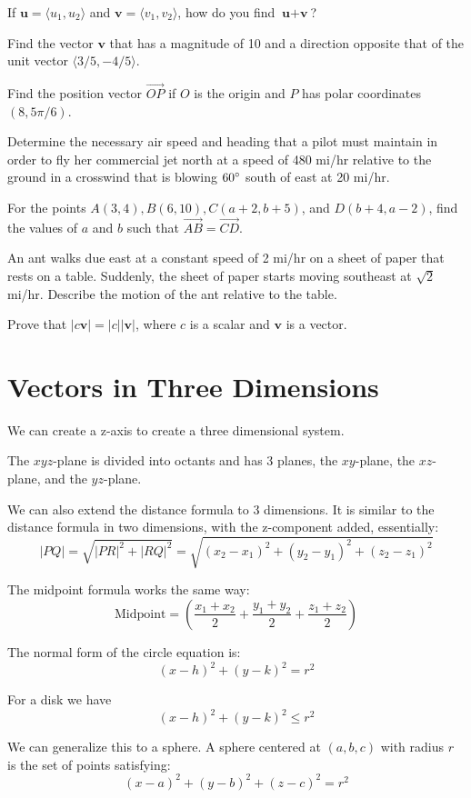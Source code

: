 \documentclass[../calc3.tex]{subfiles}
\begin{document}
\ex If $\textbf{u}=\langle u_1,u_2\rangle$ and $\textbf{v}=\langle v_1,v_2\rangle$, how do you find $\textbf{u}+\textbf{v}$?

\ex Find the vector $\textbf{v}$ that has a magnitude of 10 and a direction opposite that of the unit vector $\langle 3/5, -4/5\rangle$.

\ex Find the position vector $\vec{OP}$ if $O$ is the origin and $P$ has polar coordinates $(8, 5\pi/6)$.

\ex Determine the necessary air speed and heading that a pilot must maintain in order to fly her commercial jet north at a speed of 480 mi/hr relative to the ground in a crosswind that is blowing $60\degree$ south of east at 20 mi/hr.

\ex For the points $A(3,4), B(6,10), C(a+2, b+5)$, and $D(b+4,a-2)$, find the values of $a$ and $b$ such that $\vec{AB}=\vec{CD}$.

\ex An ant walks due east at a constant speed of 2 mi/hr on a sheet of paper that rests on a table. Suddenly, the sheet of paper starts moving southeast at $\sqrt{2}$ mi/hr. Describe the motion of the ant relative to the table.

\ex Prove that $|c\textbf{v}|=|c||\textbf{v}|$, where $c$ is a scalar and $\textbf{v}$ is a vector.

\section{Vectors in Three Dimensions}
We can create a z-axis to create a three dimensional system.

The $xyz$-plane is divided into octants and has 3 planes, the $xy$-plane, the $xz$-plane, and the $yz$-plane. 

We can also extend the distance formula to 3 dimensions. It is similar to the distance 
formula in two dimensions, with the z-component added, essentially:
\[|PQ|=\sqrt{|PR|^2+|RQ|^2}=\sqrt{(x_2-x_1)^2+(y_2-y_1)^2+(z_2-z_1)^2}\]

The midpoint formula works the same way:
\[\text{Midpoint}=\left(\frac{x_1+x_2}{2}+\frac{y_1+y_2}{2}+\frac{z_1+z_2}{2}\right)\]

The normal form of the circle equation is: 
\[(x-h)^2+(y-k)^2=r^2\]

For a disk we have 
\[(x-h)^2+(y-k)^2\leq r^2\]

We can generalize this to a sphere. A sphere centered at $(a,b,c)$ with radius $r$ is the set of points satisfying:
\[(x-a)^2+(y-b)^2+(z-c)^2=r^2\]
\end{document}
